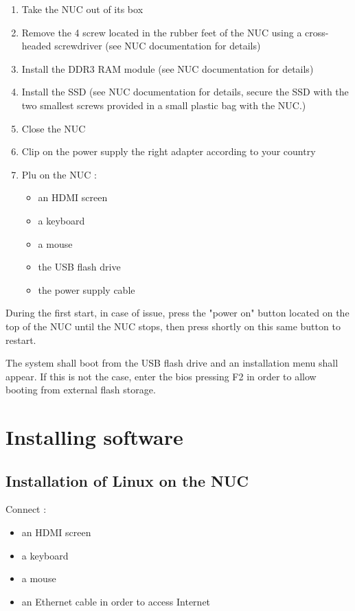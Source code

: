 \documentclass[a4paper]{ffco-rapport}
\begin{document}
\begin{enumerate}
	\item Take the NUC out of its box
	\item Remove the 4 screw located in the rubber feet of the NUC using a cross-headed screwdriver (see NUC documentation for details)
	\item Install the DDR3 RAM module (see NUC documentation for details)
	\item Install the SSD (see NUC documentation for details, secure the SSD with the two smallest screws provided in a small plastic bag with the NUC.)
	\item Close the NUC
	\item Clip on the power supply the right adapter according to your country
	\item Plu on the NUC :
	\begin{itemize}
		\item an HDMI screen
		\item a keyboard
		\item a mouse
		\item the USB flash drive
		\item the power supply cable
	\end{itemize}
\end{enumerate}

During the first start, in case of issue, press the "power on" button located on the top of the NUC until the NUC stops, then press shortly on this same button to restart.

The system shall boot from the USB flash drive and an installation menu shall appear. If this is not the case, enter the bios pressing F2 in order to allow booting from external flash storage.

\chapter{Installing software}

\section{Installation of Linux on the NUC}
Connect :
\begin{itemize}
	\item an HDMI screen
	\item a keyboard
	\item a mouse
	\item an Ethernet cable in order to access Internet
\end{itemize}
\end{document}
